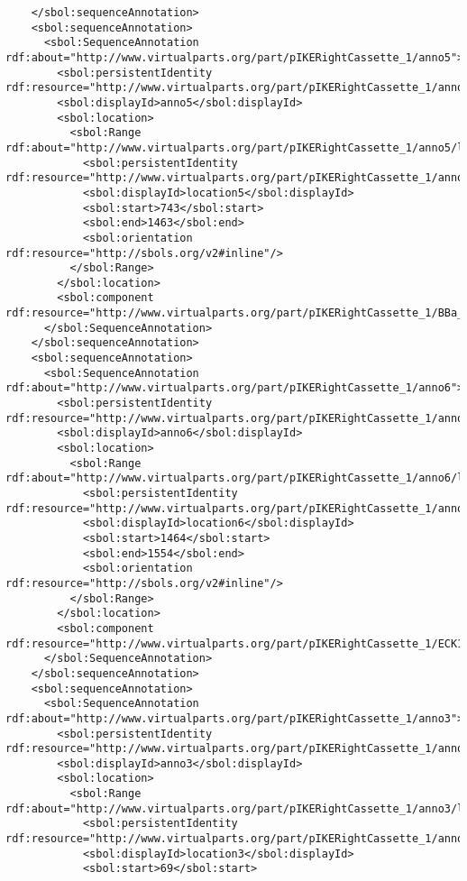 \begin{lstlisting}
    </sbol:sequenceAnnotation>
    <sbol:sequenceAnnotation>
      <sbol:SequenceAnnotation rdf:about="http://www.virtualparts.org/part/pIKERightCassette_1/anno5">
        <sbol:persistentIdentity rdf:resource="http://www.virtualparts.org/part/pIKERightCassette_1/anno5"/>
        <sbol:displayId>anno5</sbol:displayId>
        <sbol:location>
          <sbol:Range rdf:about="http://www.virtualparts.org/part/pIKERightCassette_1/anno5/location5">
            <sbol:persistentIdentity rdf:resource="http://www.virtualparts.org/part/pIKERightCassette_1/anno5/location5"/>
            <sbol:displayId>location5</sbol:displayId>
            <sbol:start>743</sbol:start>
            <sbol:end>1463</sbol:end>
            <sbol:orientation rdf:resource="http://sbols.org/v2#inline"/>
          </sbol:Range>
        </sbol:location>
        <sbol:component rdf:resource="http://www.virtualparts.org/part/pIKERightCassette_1/BBa_E0040"/>
      </sbol:SequenceAnnotation>
    </sbol:sequenceAnnotation>
    <sbol:sequenceAnnotation>
      <sbol:SequenceAnnotation rdf:about="http://www.virtualparts.org/part/pIKERightCassette_1/anno6">
        <sbol:persistentIdentity rdf:resource="http://www.virtualparts.org/part/pIKERightCassette_1/anno6"/>
        <sbol:displayId>anno6</sbol:displayId>
        <sbol:location>
          <sbol:Range rdf:about="http://www.virtualparts.org/part/pIKERightCassette_1/anno6/location6">
            <sbol:persistentIdentity rdf:resource="http://www.virtualparts.org/part/pIKERightCassette_1/anno6/location6"/>
            <sbol:displayId>location6</sbol:displayId>
            <sbol:start>1464</sbol:start>
            <sbol:end>1554</sbol:end>
            <sbol:orientation rdf:resource="http://sbols.org/v2#inline"/>
          </sbol:Range>
        </sbol:location>
        <sbol:component rdf:resource="http://www.virtualparts.org/part/pIKERightCassette_1/ECK120033736"/>
      </sbol:SequenceAnnotation>
    </sbol:sequenceAnnotation>
    <sbol:sequenceAnnotation>
      <sbol:SequenceAnnotation rdf:about="http://www.virtualparts.org/part/pIKERightCassette_1/anno3">
        <sbol:persistentIdentity rdf:resource="http://www.virtualparts.org/part/pIKERightCassette_1/anno3"/>
        <sbol:displayId>anno3</sbol:displayId>
        <sbol:location>
          <sbol:Range rdf:about="http://www.virtualparts.org/part/pIKERightCassette_1/anno3/location3">
            <sbol:persistentIdentity rdf:resource="http://www.virtualparts.org/part/pIKERightCassette_1/anno3/location3"/>
            <sbol:displayId>location3</sbol:displayId>
            <sbol:start>69</sbol:start>

\end{lstlisting}
